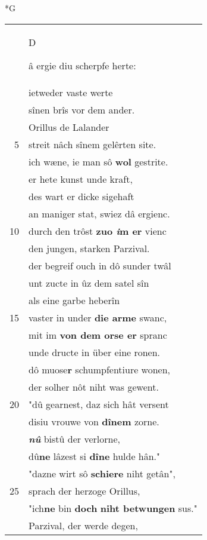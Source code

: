 \documentclass[8pt,a4paper,notitlepage]{article}
\begin{document}
\newpage
\begin{table}[ht]
\begin{minipage}[t]{0.5\linewidth}
\small
\begin{center}*G
\end{center}
\begin{tabular}{rl}
 & \begin{large}D\end{large}â ergie diu scherpfe herte:\\ 
 & ietweder vaste werte\\ 
 & sînen brîs vor dem ander.\\ 
 & Orillus de Lalander\\ 
5 & streit nâch sînem gelêrten site.\\ 
 & ich wæne, ie man sô \textbf{wol} gestrite.\\ 
 & er hete kunst unde kraft,\\ 
 & des wart er dicke sigehaft\\ 
 & an maniger stat, swiez dâ ergienc.\\ 
10 & durch den trôst \textbf{zuo \textit{i}m er} vienc\\ 
 & den jungen, starken Parzival.\\ 
 & der begreif ouch in dô sunder twâl\\ 
 & unt zucte in ûz dem satel sîn\\ 
 & als eine garbe heberîn\\ 
15 & vaster in under \textbf{die arme} swanc,\\ 
 & mit im \textbf{von dem orse er} spranc\\ 
 & unde dructe in über eine ronen.\\ 
 & dô muose\textbf{r} schumpfentiure wonen,\\ 
 & der solher nôt niht was gewent.\\ 
20 & "dû gearnest, daz sich hât versent\\ 
 & disiu vrouwe von \textbf{dînem} zorne.\\ 
 & \textit{\textbf{nû}} bistû der verlorne,\\ 
 & dû\textbf{ne} lâzest si \textbf{dîne} hulde hân."\\ 
 & "dazne wirt sô \textbf{schiere} niht getân",\\ 
25 & sprach der herzoge Orillus,\\ 
 & "ich\textbf{ne} bin \textbf{doch} \textbf{niht betwungen} sus."\\ 
 & Parzival, der werde degen,\\ 

\end{tabular}
\end{minipage}
\end{table}
\end{document}
